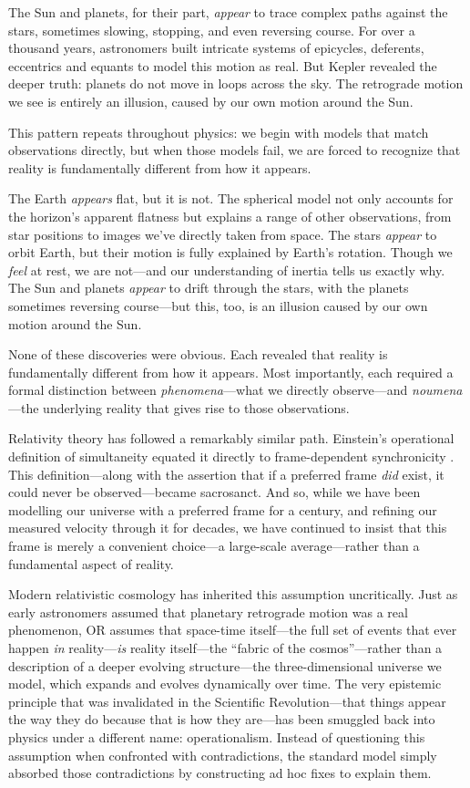 \documentclass[aps,prd,reprint,superscriptaddress]{revtex4-2}
\begin{document}
The Sun and planets, for their part, \textit{appear} to trace complex paths against the stars, sometimes slowing, stopping, and even reversing course. For over a thousand years, astronomers built intricate systems of epicycles, deferents, eccentrics and equants to model this motion as real. But Kepler revealed the deeper truth: planets do not move in loops across the sky. The retrograde motion we see is entirely an illusion, caused by our own motion around the Sun.

This pattern repeats throughout physics: we begin with models that match observations directly, but when those models fail, we are forced to recognize that reality is fundamentally different from how it appears.

The Earth \textit{appears} flat, but it is not. The spherical model not only accounts for the horizon's apparent flatness but explains a range of other observations, from star positions to images we've directly taken from space. The stars \textit{appear} to orbit Earth, but their motion is fully explained by Earth's rotation. Though we \textit{feel} at rest, we are not---and our understanding of inertia tells us exactly why. The Sun and planets \textit{appear} to drift through the stars, with the planets sometimes reversing course---but this, too, is an illusion caused by our own motion around the Sun.

None of these discoveries were obvious. Each revealed that reality is fundamentally different from how it appears. Most importantly, each required a formal distinction between \textit{phenomena}---what we directly observe---and \textit{noumena}---the underlying reality that gives rise to those observations.

Relativity theory has followed a remarkably similar path. Einstein's operational definition of simultaneity equated it directly to frame-dependent synchronicity \cite{Einstein1905a,Einstein1952}. This definition---along with the assertion that if a preferred frame \textit{did} exist, it could never be observed---became sacrosanct. And so, while we have been modelling our universe with a preferred frame for a century, and refining our measured velocity through it for decades, we have continued to insist that this frame is merely a convenient choice---a large-scale average---rather than a fundamental aspect of reality.

Modern relativistic cosmology has inherited this assumption uncritically. Just as early astronomers assumed that planetary retrograde motion was a real phenomenon, OR assumes that space-time itself---the full set of events that ever happen \textit{in} reality---\textit{is} reality itself---the ``fabric of the cosmos''---rather than a description of a deeper evolving structure---the three-dimensional universe we model, which expands and evolves dynamically over time. The very epistemic principle that was invalidated in the Scientific Revolution---that things appear the way they do because that is how they are---has been smuggled back into physics under a different name: operationalism. Instead of questioning this assumption when confronted with contradictions, the standard model simply absorbed those contradictions by constructing ad hoc fixes to explain them.
\end{document}
